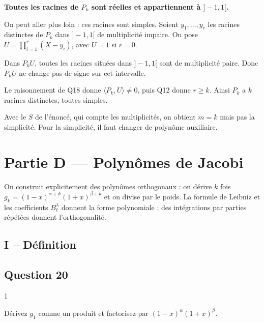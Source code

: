 \documentclass[11pt,a4paper]{article}
\newcommand{\equationajustee}[1]{%
  \sbox{\boiteequation}{$\displaystyle #1$}%
  \ifdim\wd\boiteequation>\linewidth
    \[\resizebox{\linewidth}{!}{\usebox{\boiteequation}}\]%
  \else
    \[#1\]%
  \fi}
\begin{document}
\equationajustee{m=k.}

\textbf{Toutes les racines de \(P_k\) sont réelles et appartiennent à \(]-1,1[\).}

On peut aller plus loin : ces racines sont simples. Soient \(y_1,\dots,y_r\) les racines distinctes de \(P_k\) dans \(]-1,1[\) de multiplicité impaire. On pose \(U=\prod_{i=1}^r(X-y_i)\), avec \(U=1\) si \(r=0\).

Dans \(P_kU\), toutes les racines situées dans \(]-1,1[\) sont de multiplicité paire. Donc \(P_kU\) ne change pas de signe sur cet intervalle.

Le raisonnement de Q18 donne \(\langle P_k,U\rangle\neq0\), puis Q12 donne \(r\geqslant k\). Ainsi \(P_k\) a \(k\) racines distinctes, toutes simples.

\begin{piege}

Avec le \(S\) de l'énoncé, qui compte les multiplicités, on obtient \(m=k\) mais pas la simplicité. Pour la simplicité, il faut changer de polynôme auxiliaire.

\end{piege}

\hypertarget{partie-d-polynuxf4mes-de-jacobi}{%
\section{Partie D --- Polynômes de Jacobi}\label{partie-d-polynuxf4mes-de-jacobi}}

On construit explicitement des polynômes orthogonaux : on dérive \(k\) fois \(g_k=(1-x)^{\alpha+k}(1+x)^{\beta+k}\) et on divise par le poids. La formule de Leibniz et les coefficients \(B^\lambda_\ell\) donnent la forme polynomiale ; des intégrations par parties répétées donnent l'orthogonalité.

\hypertarget{i-duxe9finition}{%
\subsection{I -- Définition}\label{i-duxe9finition}}

\hypertarget{question-20}{%
\subsection{Question 20}\label{question-20}}

\begin{indication}{1}

Dérivez \(g_1\) comme un produit et factorisez par \((1-x)^\alpha(1+x)^\beta\).

\end{indication}
\end{document}

